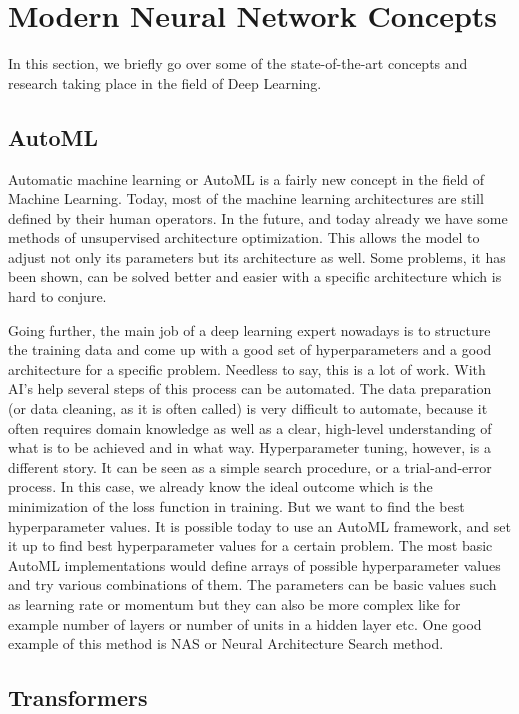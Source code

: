 \documentclass[b5paper]{book}
\let\cite\parencite
\begin{document}
\section{Modern Neural Network Concepts}

In this section, we briefly go over some of the state-of-the-art concepts and research taking place in the field of Deep Learning.

\subsection{AutoML}

Automatic machine learning or AutoML \cite{he2021automl} is a fairly new concept in the field of Machine Learning. Today, most of the machine learning architectures are still defined by their human operators. In the future, and today already we have some methods of unsupervised architecture optimization. This allows the model to adjust not only its parameters but its architecture as well. Some problems, it has been shown, can be solved better and easier with a specific architecture which is hard to conjure. 

Going further, the main job of a deep learning expert nowadays is to structure the training data and come up with a good set of hyperparameters and a good architecture for a specific problem. Needless to say, this is a lot of work. With AI's help several steps of this process can be automated. The data preparation (or data cleaning, as it is often called) is very difficult to automate, because it often requires domain knowledge as well as a clear, high-level understanding of what is to be achieved and in what way. Hyperparameter tuning, however, is a different story. It can be seen as a simple search procedure, or a trial-and-error process. In this case, we already know the ideal outcome which is the minimization of the loss function in training. But we want to find the best hyperparameter values. It is possible today to use an AutoML framework, and set it up to find best hyperparameter values for a certain problem. The most basic AutoML implementations would define arrays of possible hyperparameter values and try various combinations of them. The parameters can be basic values such as learning rate or momentum but they can also be more complex like for example number of layers or number of units in a hidden layer etc. One good example of this method is NAS or Neural Architecture Search \cite{elsken2019neural} method.

\subsection{Transformers}
\end{document}
